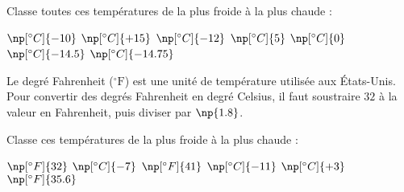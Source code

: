 \documentclass[../Chapitre2.tex]{subfiles}
\begin{document}


\begin{enonce}
  Classe toutes ces températures de la plus froide à la plus chaude :

\bigskip

  $\np[^\circ C]{-10}$ \hfill $\np[^\circ C]{+15}$ \hfill $\np[^\circ C]{-12}$ \hfill $\np[^\circ C]{5}$ \hfill $\np[^\circ C]{0}$ \hfill $\np[^\circ C]{-14.5}$ \hfill $\np[^\circ C]{-14.75}$  
\end{enonce}



\begin{enonce}
  Le degré Fahrenheit ($^\circ \text{F}$) est une unité de température utilisée aux États-Unis. Pour convertir des degrés Fahrenheit en degré Celsius, il faut soustraire $32$ à la valeur en Fahrenheit, puis diviser par $\np{1.8}$.
  
  Classe ces températures de la plus froide à la plus chaude :

  \bigskip

  $\np[^\circ F]{32}$ \hfill $\np[^\circ C]{-7}$ \hfill $\np[^\circ F]{41}$ \hfill $\np[^\circ C]{-11}$ \hfill $\np[^\circ C]{+3}$ \hfill $\np[^\circ F]{35.6}$
\end{enonce}
\end{document}
